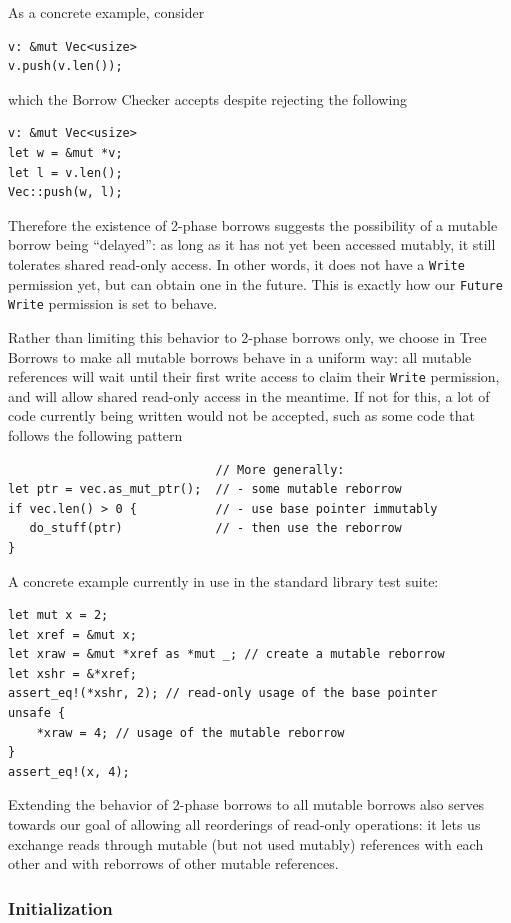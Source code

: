 \documentclass[a4paper,11pt]{article}
\theoremstyle{plain}
\theoremstyle{definition}
\theoremstyle{remark}
\newcommand{\tperm}[1]{\texttt{#1}}
\begin{document}
As a concrete example, consider
\begin{lstlisting}
v: &mut Vec<usize>
v.push(v.len());
\end{lstlisting}
which the Borrow Checker accepts despite rejecting the following
\begin{lstlisting}
v: &mut Vec<usize>
let w = &mut *v;
let l = v.len();
Vec::push(w, l);
\end{lstlisting}

Therefore the existence of 2-phase borrows suggests the possibility of a mutable
borrow being ``delayed'': as long as it has not yet been accessed mutably, it still
tolerates shared read-only access. In other words, it does not have a \tperm{Write}
permission yet, but can obtain one in the future. This is exactly how our
\tperm{Future Write} permission is set to behave.

Rather than limiting this behavior to 2-phase borrows only, we choose in Tree
Borrows to make all mutable borrows behave in a uniform way: all mutable references
will wait until their first write access to claim their \tperm{Write} permission,
and will allow shared read-only access in the meantime. If not for this, a lot
of code currently being written would not be accepted, such as some code that
follows the following pattern
\begin{lstlisting}
                             // More generally:
let ptr = vec.as_mut_ptr();  // - some mutable reborrow
if vec.len() > 0 {           // - use base pointer immutably
   do_stuff(ptr)             // - then use the reborrow
}
\end{lstlisting}

A concrete example currently in use in the standard library test suite:
\begin{lstlisting}
let mut x = 2;
let xref = &mut x;
let xraw = &mut *xref as *mut _; // create a mutable reborrow
let xshr = &*xref;
assert_eq!(*xshr, 2); // read-only usage of the base pointer
unsafe {
    *xraw = 4; // usage of the mutable reborrow
}
assert_eq!(x, 4);
\end{lstlisting}

Extending the behavior of 2-phase borrows to all mutable borrows also serves
towards our goal of allowing all reorderings of read-only operations: it lets
us exchange reads through mutable (but not used mutably) references with each
other and with reborrows of other mutable references.

\subsubsection{Initialization}
\end{document}
